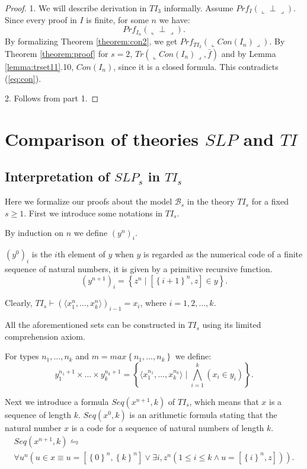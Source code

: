\documentclass{asl}
\theoremstyle{definition}
\begin{document}
\begin{proof}
1. We will describe derivation in $TI_3$ informally. Assume  $Prf_I(\llcorner \perp \lrcorner)$. Since every proof in $I$ is finite, for some $n$ we have: 
\begin{equation}
Prf_{I_n}(\llcorner \perp \lrcorner).
\label{eq:con}
\end{equation}
By formalizing Theorem \ref{theorem:con2}, we get $Prf_{TI_2}(\llcorner Con(I_n) \lrcorner)$. By Theorem \ref{theorem:proof} for $s=2$, $Tr(\llcorner Con(I_n) \lrcorner,\bar{f})$ and by Lemma \ref{lemma:trset11}.10, $Con(I_n)$, since it is a closed formula. This contradicts (\ref{eq:con}).

2. Follows from part 1.
\end{proof}

\section{Comparison of theories $SLP$ and $TI$}
\subsection{Interpretation of $SLP_s$ in $TI_s$}
Here we formalize our proofs about the model $\mathcal{B}_s$ in the theory $TI_s$ for a fixed $s\geqslant 1$. First we introduce some notations in $TI_s$.

By induction on $n$ we define $\left(y^n\right)_i$. 

$\left(y^0\right)_i$ is the $i$th element of $y$ when $y$ is regarded as the numerical code of a finite sequence of natural numbers, it is given by a primitive recursive function.
\[\left(y^{n+1}\right)_i=\left\lbrace z^n \mid \left[\left\lbrace i+1 \right\rbrace ^n, z \right]\in y\right\rbrace.\]

Clearly, $TI_s \vdash \left(\langle x_1^n,\ldots,x_k^n\rangle \right)_{i-1}=x_i$, where $i=1,2,\ldots,k$.

All the aforementioned sets can be constructed in $TI_s$ using its limited comprehension axiom.

For types $n_1,\ldots,n_k$ and $m=max\left\lbrace n_1,\ldots,n_k \right\rbrace$ we define:
\[y_1^{n_1+1}\times \ldots \times y_k^{n_k+1}=
\left\lbrace \langle x_1^{n_1},\ldots,x_k^{n_k}\rangle \mid \bigwedge_{i=1}^k(x_i\in y_i) \right\rbrace. \]

Next we introduce a formula $Seq(x^{n+1},k)$ of $TI_s$, which means that $x$ is a sequence of length $k$.
$Seq(x^0,k)$ is an arithmetic formula stating that the natural number $x$ is a code for a sequence of natural numbers of length $k$.
\begin{multline*}
Seq(x^{n+1},k)\leftrightharpoons
 \\
\forall u^n\left(u\in x\equiv  
u=\left[\left\lbrace 0\right \rbrace^{n},\left\lbrace k\right \rbrace^{n} \right] \vee \exists i, z^n 
\left( 1\leqslant i\leqslant k \wedge u=\left[\left\lbrace i\right \rbrace^{n},z \right] \right)\right).
\end{multline*}
\end{document}
